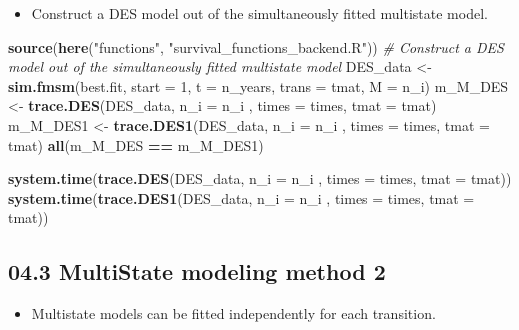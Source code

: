 \documentclass[
]{article}
\newenvironment{Shaded}{\begin{snugshade}}{\end{snugshade}}
\newcommand{\CommentTok}[1]{\textcolor[rgb]{0.56,0.35,0.01}{\textit{#1}}}
\newcommand{\DataTypeTok}[1]{\textcolor[rgb]{0.13,0.29,0.53}{#1}}
\newcommand{\DecValTok}[1]{\textcolor[rgb]{0.00,0.00,0.81}{#1}}
\newcommand{\KeywordTok}[1]{\textcolor[rgb]{0.13,0.29,0.53}{\textbf{#1}}}
\newcommand{\NormalTok}[1]{#1}
\newcommand{\OperatorTok}[1]{\textcolor[rgb]{0.81,0.36,0.00}{\textbf{#1}}}
\newcommand{\StringTok}[1]{\textcolor[rgb]{0.31,0.60,0.02}{#1}}
\providecommand{\tightlist}{%
  \setlength{\itemsep}{0pt}\setlength{\parskip}{0pt}}
\begin{document}
\begin{itemize}
\tightlist
\item
  Construct a DES model out of the simultaneously fitted multistate
  model.
\end{itemize}

\begin{Shaded}
\begin{Highlighting}[]
\KeywordTok{source}\NormalTok{(}\KeywordTok{here}\NormalTok{(}\StringTok{"functions"}\NormalTok{, }\StringTok{"survival_functions_backend.R"}\NormalTok{))}
\CommentTok{# Construct a DES model out of the simultaneously fitted multistate model}
\NormalTok{DES_data <-}\StringTok{ }\KeywordTok{sim.fmsm}\NormalTok{(best.fit, }\DataTypeTok{start =} \DecValTok{1}\NormalTok{, }\DataTypeTok{t =}\NormalTok{ n_years, }\DataTypeTok{trans =}\NormalTok{ tmat, }\DataTypeTok{M =}\NormalTok{ n_i)}
\NormalTok{m_M_DES  <-}\StringTok{ }\KeywordTok{trace.DES}\NormalTok{(DES_data, }\DataTypeTok{n_i  =}\NormalTok{ n_i , }\DataTypeTok{times =}\NormalTok{ times, }\DataTypeTok{tmat =}\NormalTok{ tmat)}
\NormalTok{m_M_DES1  <-}\StringTok{ }\KeywordTok{trace.DES1}\NormalTok{(DES_data, }\DataTypeTok{n_i  =}\NormalTok{ n_i , }\DataTypeTok{times =}\NormalTok{ times, }\DataTypeTok{tmat =}\NormalTok{ tmat)}
\KeywordTok{all}\NormalTok{(m_M_DES }\OperatorTok{==}\StringTok{ }\NormalTok{m_M_DES1)}
\end{Highlighting}
\end{Shaded}

\begin{Shaded}
\begin{Highlighting}[]
\KeywordTok{system.time}\NormalTok{(}\KeywordTok{trace.DES}\NormalTok{(DES_data, }\DataTypeTok{n_i  =}\NormalTok{ n_i , }\DataTypeTok{times =}\NormalTok{ times, }\DataTypeTok{tmat =}\NormalTok{ tmat))}
\KeywordTok{system.time}\NormalTok{(}\KeywordTok{trace.DES1}\NormalTok{(DES_data, }\DataTypeTok{n_i  =}\NormalTok{ n_i , }\DataTypeTok{times =}\NormalTok{ times, }\DataTypeTok{tmat =}\NormalTok{ tmat))}
\end{Highlighting}
\end{Shaded}

\hypertarget{multistate-modeling-method-2}{%
\subsection{04.3 MultiState modeling method
2}\label{multistate-modeling-method-2}}

\begin{itemize}
\tightlist
\item
  Multistate models can be fitted independently for each transition.
\end{itemize}
\end{document}
